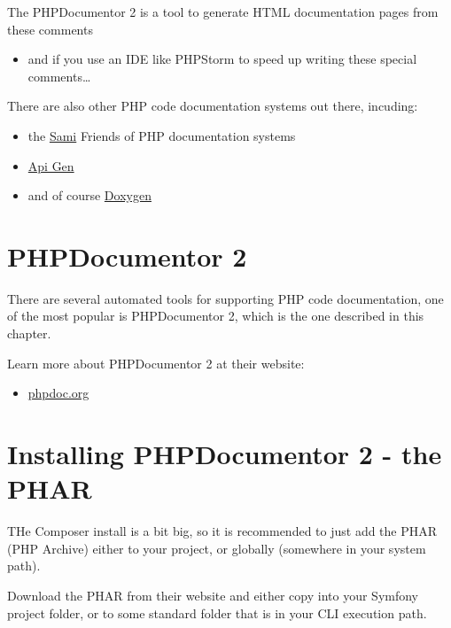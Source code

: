\documentclass[a4paperpaper,openright]{book}
\providecommand{\tightlist}{%
  \setlength{\itemsep}{0pt}\setlength{\parskip}{0pt}}
\begin{document}
The PHPDocumentor 2 is a tool to generate HTML documentation pages from
these comments

\begin{itemize}
\tightlist
\item
  and if you use an IDE like PHPStorm to speed up writing these special
  comments\ldots{}
\end{itemize}

There are also other PHP code documentation systems out there, incuding:

\begin{itemize}
\item
  the \href{https://github.com/FriendsOfPHP/sami}{Sami} Friends of PHP
  documentation systems
\item
  \href{https://github.com/ApiGen/ApiGen}{Api Gen}
\item
  and of course \href{http://www.stack.nl/~dimitri/doxygen/}{Doxygen}
\end{itemize}

\hypertarget{phpdocumentor-2}{%
\section{PHPDocumentor 2}\label{phpdocumentor-2}}

There are several automated tools for supporting PHP code documentation,
one of the most popular is PHPDocumentor 2, which is the one described
in this chapter.

Learn more about PHPDocumentor 2 at their website:

\begin{itemize}
\tightlist
\item
  \href{https://www.phpdoc.org/}{phpdoc.org}
\end{itemize}

\hypertarget{installing-phpdocumentor-2---the-phar}{%
\section{Installing PHPDocumentor 2 - the
PHAR}\label{installing-phpdocumentor-2---the-phar}}

THe Composer install is a bit big, so it is recommended to just add the
PHAR (PHP Archive) either to your project, or globally (somewhere in
your system path).

Download the PHAR from their website and either copy into your Symfony
project folder, or to some standard folder that is in your CLI execution
path.
\end{document}

